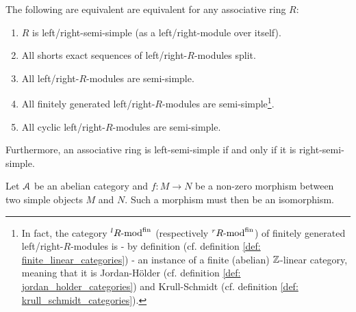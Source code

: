             \begin{example} \label{example: modules_over_semi_simple_rings}
                \cite[Theorem 2.5]{lam_first_course_in_noncommutative_rings} The following are equivalent are equivalent for any associative ring $R$:
                    \noindent
                    \begin{enumerate}
                        \item $R$ is left/right-semi-simple (as a left/right-module over itself).
                        \item All shorts exact sequences of left/right-$R$-modules split.
                        \item All left/right-$R$-modules are semi-simple.
                        \item All finitely generated left/right-$R$-modules are semi-simple\footnote{In fact, the category ${}^lR\text{-}\mathrm{mod}^{\mathrm{fin}}$ (respectively ${}^rR\text{-}\mathrm{mod}^{\mathrm{fin}}$) of finitely generated left/right-$R$-modules is - by definition (cf. definition \ref{def: finite_linear_categories}) - an instance of a finite (abelian) $\mathbb{Z}$-linear category, meaning that it is Jordan-H\"older (cf. definition \ref{def: jordan_holder_categories}) and Krull-Schmidt (cf. definition \ref{def: krull_schmidt_categories}).}. 
                        \item All cyclic left/right-$R$-modules are semi-simple. 
                    \end{enumerate}
                Furthermore, an associative ring is left-semi-simple if and only if it is right-semi-simple.  
            \end{example}
            \begin{lemma} \label{lemma: schur_lemma_for_abelian_categories}
                Let $\mathcal{A}$ be an abelian category and $f: M \to N$ be a non-zero morphism between two simple objects $M$ and $N$. Such a morphism must then be an isomorphism.
            \end{lemma}
